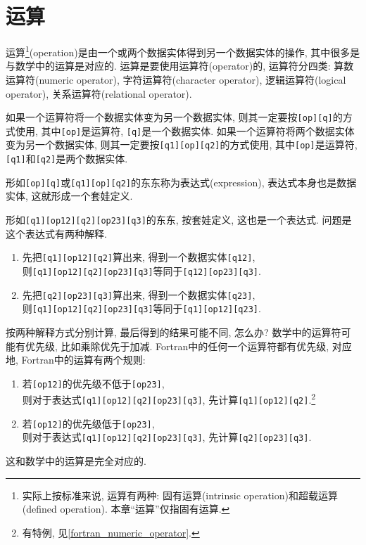 \section{运算}\label{fortran_opration}

运算\footnote{
    实际上按标准来说, 运算有两种: 固有运算(intrinsic operation)和超载运算(defined operation). 本章``运算''仅指固有运算.
}(operation)是由一个或两个数据实体得到另一个数据实体的操作, 其中很多是与数学中的运算是对应的. 运算是要使用运算符(operator)的, 运算符分四类: 算数运算符(numeric operator), 字符运算符(character operator), 逻辑运算符(logical operator), 关系运算符(relational operator).

如果一个运算符将一个数据实体变为另一个数据实体, 则其一定要按\verb|[op][q]|的方式使用, 其中\verb|[op]|是运算符, \verb|[q]|是一个数据实体. 如果一个运算符将两个数据实体变为另一个数据实体, 则其一定要按\verb|[q1][op][q2]|的方式使用, 其中\verb|[op]|是运算符, \verb|[q1]|和\verb|[q2]|是两个数据实体. 

形如\verb|[op][q]|或\verb|[q1][op][q2]|的东东称为表达式(expression), 表达式本身也是数据实体, 这就形成一个套娃定义.

形如\verb|[q1][op12][q2][op23][q3]|的东东, 按套娃定义, 这也是一个表达式. 问题是这个表达式有两种解释.
\begin{enumerate}
    \item 先把\verb|[q1][op12][q2]|算出来, 得到一个数据实体\verb|[q12]|,\\则\verb|[q1][op12][q2][op23][q3]|等同于\verb|[q12][op23][q3]|.
    \item 先把\verb|[q2][op23][q3]|算出来, 得到一个数据实体\verb|[q23]|,\\则\verb|[q1][op12][q2][op23][q3]|等同于\verb|[q1][op12][q23]|.
\end{enumerate}
按两种解释方式分别计算, 最后得到的结果可能不同, 怎么办? 数学中的运算符可能有优先级, 比如乘除优先于加减. Fortran中的任何一个运算符都有优先级, 对应地, Fortran中的运算有两个规则:
\begin{enumerate}
    \item 若\verb|[op12]|的优先级不低于\verb|[op23]|,\\则对于表达式\verb|[q1][op12][q2][op23][q3]|, 先计算\verb|[q1][op12][q2]|.\footnote{
        有特例, 见\ref{fortran_numeric_operator}.
    }
    \item 若\verb|[op12]|的优先级低于\verb|[op23]|,\\则对于表达式\verb|[q1][op12][q2][op23][q3]|, 先计算\verb|[q2][op23][q3]|.
\end{enumerate}
这和数学中的运算是完全对应的.


